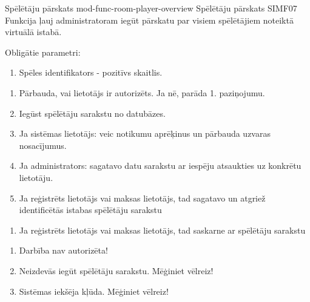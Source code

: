 \moduleFunctionTable
{Spēlētāju pārskats}
{mod-func-room-player-overview}
{Spēlētāju pārskats}
{SIMF07}
{
	Funkcija ļauj administratoram iegūt pārskatu par visiem spēlētājiem noteiktā virtuālā istabā.
}
{
	Obligātie parametri:
	\begin{enumerate}
		\item Spēles identifikators - pozitīvs skaitlis.
	\end{enumerate}
}
{
	\begin{enumerate}
		\item Pārbauda, vai lietotājs ir autorizēts. Ja nē, parāda 1. paziņojumu.
		\item Iegūst spēlētāju sarakstu no datubāzes.
		\item Ja sistēmas lietotājs: veic notikumu aprēķinus un pārbauda uzvaras nosacījumus.
		\item Ja administrators: sagatavo datu sarakstu ar iespēju atsaukties uz konkrētu lietotāju.
		\item Ja reģistrēts lietotājs vai maksas lietotājs, tad sagatavo un atgriež identificētās istabas spēlētāju sarakstu
	\end{enumerate}
}
{
	\begin{enumerate}
		\item Ja reģistrēts lietotājs vai maksas lietotājs, tad saskarne ar spēlētāju sarakstu
	\end{enumerate}
}
{
	\begin{enumerate}
		\item Darbība nav autorizēta!
		\item Neizdevās iegūt spēlētāju sarakstu. Mēģiniet vēlreiz!
		\item Sistēmas iekšēja kļūda. Mēģiniet vēlreiz!
	\end{enumerate}
}

